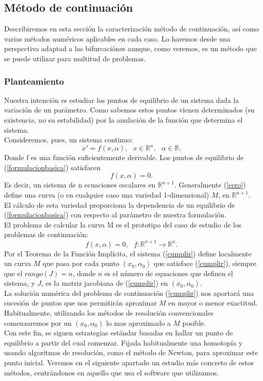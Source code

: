 \subsection{Método de continuación}
Describiremos en esta sección la caracterización método de continuación, así como varios métodos numéricos aplicables en cada caso. Lo haremos desde una perspectiva adaptad a las bifurcaciónes aunque, como veremos, es un método que se puede utilizar para multitud de problemas.
\subsubsection{Planteamiento}
Nuestra intención es estudiar los puntos de equilibrio de un sistema dada la variación de un parámetro. Como sabemos estos puntos vienen determinados (su existencia, no su estabilidad) por la anulación de la función que determina el sistema.\\
Consideremos, pues, un sistema continuo:
\begin{equation}
x'=f(x,\alpha),\text{ } x\in\mathbb{R}^n, \text{ }\alpha\in\mathbb{R}.
\label{formulacionbasica}
\end{equation}
Donde f es una función suficientemente derivable. Los puntos de equilibrio de (\ref{formulacionbasica}) satisfacen
\begin{equation}
f(x, \alpha) = 0.
\label{cero}
\end{equation}
Es decir, un sistema de n ecuaciones escalares en $\mathbb{R}^{n+1}$. Generalmente (\ref{cero}) define una curva (o en cualquier caso una variedad 1-dimensional) $M$, en $\mathbb{R}^{n+1}$. El cálculo de esta
variedad proporciona la dependencia de un equilibrio de (\ref{formulacionbasica}) con respecto al parámetro  de nuestra formulación.\\
El problema de calcular la curva M es el prototipo del caso de estudio de los problemas de continuación:
\begin{equation}
f(x,\alpha)=0,\text{ } f:\mathbb{R}^{n+1}\rightarrow\mathbb{R}^n.
\label{cumplir}
\end{equation}
Por el Teorema de la Función Implícita, el sistema (\ref{cumplir}) define localmente un
curva $M$ que pasa por cada punto $(x_0,\alpha_0)$ que satisface (\ref{cumplir}), siempre que el $rango(J)
= n$, donde $n$ es el número de equaciones que definen el sistema, y $J$, es la matriz jacobiana de (\ref{cumplir}) en $(x_0,\alpha_0)$.\\
La solución numérica del problema de continuación (\ref{cumplir}) nos aportará una sucesión de puntos que nos permitirán aproximar $M$ en mayor o menor exactitud. Habitualmente, utilizando los métodos de resolución convencionales comenzaremos por un $(x_0,\alpha_0)$ lo mas aproximado a $M$ posible. \\Con este fin, se siguen estrategias estándar basadas en hallar un punto de equilibrio a partir del cual comenzar. Fijada habitualmente una homotopía y usando algoritmos de resolución, como el método de Newton, para aproximar este punto inicial. Veremos en el siguiente apartado un estudio más concreto de estos métodos, centrándonos en aquello que usa el software que utilizamos. 

